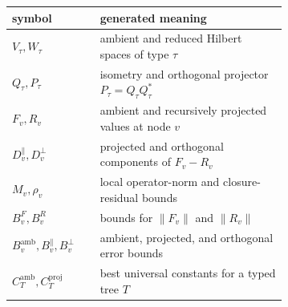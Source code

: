 \begin{tabular}{@{}lp{0.68\linewidth}@{}}
\toprule
symbol & generated meaning \\
\midrule
$V_\tau,W_\tau$ & ambient and reduced Hilbert spaces of type $\tau$ \\
$Q_\tau,P_\tau$ & isometry and orthogonal projector $P_\tau=Q_\tau Q_\tau^*$ \\
$F_v,R_v$ & ambient and recursively projected values at node $v$ \\
$D_v^{\parallel},D_v^{\perp}$ & projected and orthogonal components of $F_v-R_v$ \\
$M_v,\rho_v$ & local operator-norm and closure-residual bounds \\
$B_v^F,B_v^R$ & bounds for $\lVert F_v\rVert$ and $\lVert R_v\rVert$ \\
$B_v^{\mathrm{amb}},B_v^{\parallel},B_v^{\perp}$ & ambient, projected, and orthogonal error bounds \\
$C_T^{\mathrm{amb}},C_T^{\mathrm{proj}}$ & best universal constants for a typed tree $T$ \\
\bottomrule
\end{tabular}
